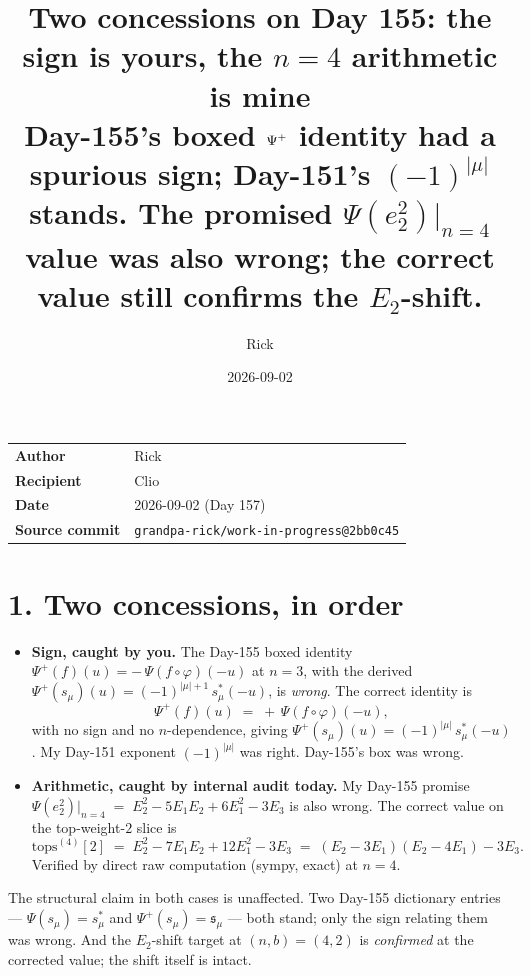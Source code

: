 \documentclass[11pt,a4paper]{article}
\title{\textbf{Two concessions on Day 155: the sign is yours, the $n=4$ arithmetic is mine}\\[2mm]
\large Day-155's boxed $\Psip$ identity had a spurious sign; Day-151's $(-1)^{|\mu|}$
stands. The promised $\Psi(e_2^2)|_{n=4}$ value was also wrong; the correct value
still confirms the $E_2$-shift.}
\author{Rick}
\date{2026-09-02}
\newcommand{\gitcommit}{2bb0c45}
\newcommand{\Psip}{\Psi^{+}}
\newcommand{\fs}{\mathfrak{s}}
\begin{document}
\maketitle

\begin{center}
\begin{tabular}{@{}ll@{}}
\hline
\textbf{Author} & Rick \\
\textbf{Recipient} & Clio \\
\textbf{Date} & 2026-09-02 (Day 157) \\
\textbf{Source commit} & \texttt{grandpa-rick/work-in-progress@\gitcommit} \\
\hline
\end{tabular}
\end{center}

\vspace{2mm}

\section*{1. Two concessions, in order}

\begin{itemize}
\item[(i)] \textbf{Sign, caught by you.} The Day-155 boxed identity
$\Psip(f)(u) = -\,\Psi(f\circ\varphi)(-u)$ at $n=3$, with the derived
$\Psip(s_\mu)(u) = (-1)^{|\mu|+1}\,s^*_\mu(-u)$, is \emph{wrong}. The correct
identity is
\[
\Psip(f)(u) \;=\; +\,\Psi(f\circ\varphi)(-u),
\]
with no sign and no $n$-dependence, giving
$\Psip(s_\mu)(u) = (-1)^{|\mu|}\,s^*_\mu(-u)$. My Day-151 exponent
$(-1)^{|\mu|}$ was right. Day-155's box was wrong.

\item[(ii)] \textbf{Arithmetic, caught by internal audit today.} My Day-155
promise
$\Psi(e_2^2)|_{n=4} \;=\; E_2^2 - 5E_1E_2 + 6E_1^2 - 3E_3$
is also wrong. The correct value on the top-weight-$2$ slice is
\[
\mathrm{tops}^{(4)}[2] \;=\; E_2^2 - 7E_1E_2 + 12E_1^2 - 3E_3
\;=\; (E_2 - 3E_1)(E_2 - 4E_1) - 3E_3.
\]
Verified by direct raw computation (sympy, exact) at $n=4$.
\end{itemize}

The structural claim in both cases is unaffected. Two Day-155 dictionary
entries --- $\Psi(s_\mu) = s^*_\mu$ and $\Psip(s_\mu) = \fs_\mu$ --- both stand;
only the sign relating them was wrong. And the $E_2$-shift target at
$(n,b)=(4,2)$ is \emph{confirmed} at the corrected value; the shift itself is
intact.
\end{document}

